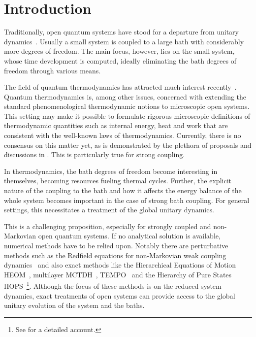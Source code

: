 \chapter{Introduction}%
\label{chap:intro}
Traditionally, open quantum systems have stood for a departure from
unitary dynamics~\cite{Weiss2012,Rivas2012,Breuer2002Jun}. Usually a
small system is coupled to a large bath with considerably more degrees
of freedom. The main focus, however, lies on the small system, whose
time development is computed, ideally eliminating the bath degrees of
freedom through various means. %

The field of quantum thermodynamics has attracted much interest
recently~\cite{Talkner2020Oct,Rivas2019Oct,Riechers2021Apr,Vinjanampathy2016Oct,Binder2018,Kurizki2021Dec,Mukherjee2020Jan,Xu2022Mar}.
Quantum thermodynamics is, among other issues, concerned with
extending the standard phenomenological thermodynamic notions to
microscopic open systems. This setting may make it possible to
formulate rigorous microscopic definitions of thermodynamic quantities
such as internal energy, heat and work that are consistent with the
well-known laws of thermodynamics. Currently, there is no consensus on
this matter yet, as is demonstrated by the plethora of proposals and
discussions in
\cite{Rivas2019Oct,Talkner2020Oct,Motz2018Nov,Wiedmann2020Mar,Senior2020Feb,Kato2015Aug,Kato2016Dec,Strasberg2021Aug,Talkner2016Aug,Bera2021Feb,Bera2021Jun,Esposito2015Dec}.
This is particularly true for strong coupling.

In thermodynamics, the bath degrees of freedom become interesting in
themselves, becoming resources fueling thermal cycles. Further, the
explicit nature of the coupling to the bath and how it affects the
energy balance of the whole system becomes important in the case of
strong bath coupling. For general settings, this necessitates a
treatment of the global unitary dynamics.

This is a challenging proposition, especially for strongly coupled and
non-Markovian open quantum systems.  If no analytical solution is
available, numerical methods have to be relied upon. Notably there are
perturbative methods such as the Redfield equations for non-Markovian
weak coupling dynamics~\cite{Davidovic2020Sep} and also exact methods
like the Hierarchical Equations of Motion
HEOM~\cite{Tanimura1990Jun,Tang2015Dec}, multilayer
MCTDH~\cite{Wang2010May}, TEMPO~\cite{Strathearn2018Aug} and the
Hierarchy of Pure States HOPS~\cite{Suess2014Oct}\footnote{See
  \cite{RichardDiss} for a detailed account.}. Although the focus of
these methods is on the reduced system dynamics, exact treatments of
open systems can provide access to the global unitary evolution of the
system and the baths.

